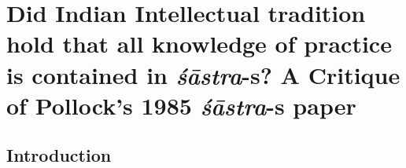 \chapter{Did Indian Intellectual tradition hold that all knowledge of practice is contained in {{\sl\bfseries śāstra}\relax}-s? A Critique of Pollock's 1985 {{\sl\bfseries śāstra}\relax}-s paper}\label{chapter10}
\vskip -10pt

\vskip -10pt



\section*{Introduction}

